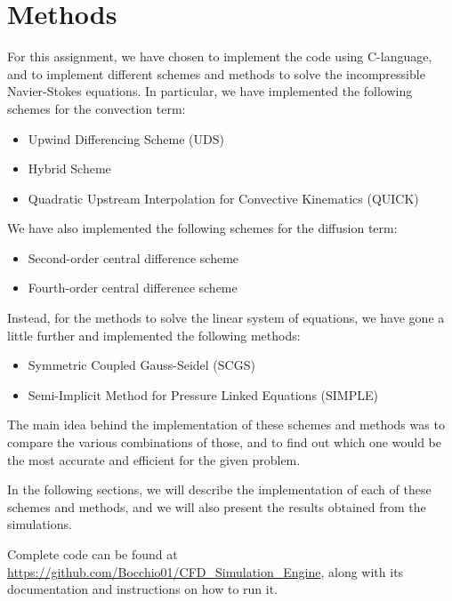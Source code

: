 \section{Methods}
\label{sec:methods}

For this assignment, we have chosen to implement the code using C-language, and to implement different schemes and methods to solve the incompressible Navier-Stokes equations.
In particular, we have implemented the following schemes for the convection term:

\begin{itemize}
    \item Upwind Differencing Scheme (UDS)
    \item Hybrid Scheme
    \item Quadratic Upstream Interpolation for Convective Kinematics (QUICK)
\end{itemize}

We have also implemented the following schemes for the diffusion term:

\begin{itemize}
    \item Second-order central difference scheme
    \item Fourth-order central difference scheme
\end{itemize}

Instead, for the methods to solve the linear system of equations, we have gone a little further and implemented the following methods:

\begin{itemize}
    \item Symmetric Coupled Gauss-Seidel (SCGS)
    \item Semi-Implicit Method for Pressure Linked Equations (SIMPLE)
\end{itemize}

The main idea behind the implementation of these schemes and methods was to compare the various combinations of those, and to find out which one would be the most accurate and efficient for the given problem.

In the following sections, we will describe the implementation of each of these schemes and methods, and we will also present the results obtained from the simulations.

Complete code can be found at \url{https://github.com/Bocchio01/CFD_Simulation_Engine}, along with its documentation and instructions on how to run it.